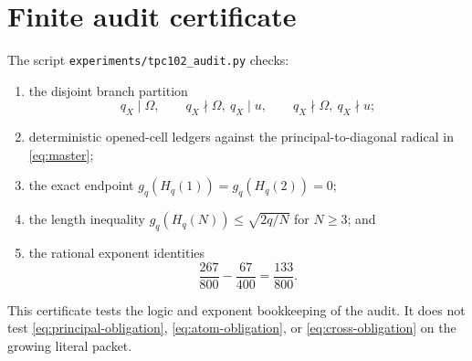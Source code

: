 \section{Finite audit certificate}
\label{sec:regression}

The script
\texttt{experiments/tpc102\_audit.py} checks:
\begin{enumerate}[leftmargin=2em]
\item the disjoint branch partition
  \[
  q_X\mid\Omega,\qquad
  q_X\nmid\Omega,\ q_X\mid u,\qquad
  q_X\nmid\Omega,\ q_X\nmid u;
  \]
\item deterministic opened-cell ledgers against the
  principal-to-diagonal radical in \eqref{eq:master};
\item the exact endpoint
  \(g_q(H_q(1))=g_q(H_q(2))=0\);
\item the length inequality
  \(g_q(H_q(N))\le\sqrt{2q/N}\) for \(N\ge3\); and
\item the rational exponent identities
  \[
  \frac{267}{800}-\frac{67}{400}
  =
  \frac{133}{800}.
  \]
\end{enumerate}
This certificate tests the logic and exponent bookkeeping of the
audit.  It does not test
\eqref{eq:principal-obligation},
\eqref{eq:atom-obligation}, or
\eqref{eq:cross-obligation} on the growing literal packet.
